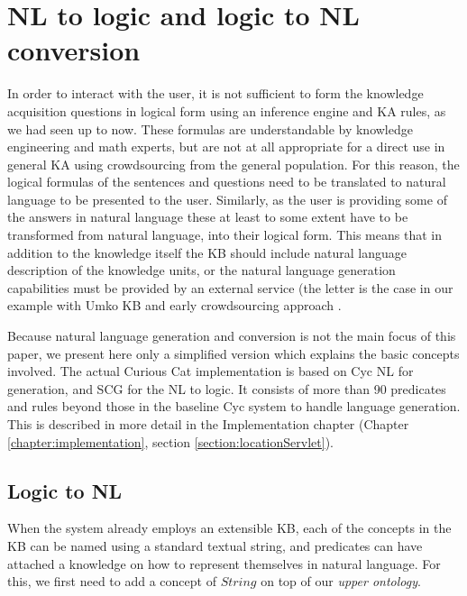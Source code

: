 \section{NL to logic and logic to NL conversion}
\label{section:nl}
In order to interact with the user, it is not sufficient to form the knowledge 
acquisition questions in logical form using an inference engine and KA rules,
as we had seen up to now. These formulas are understandable by knowledge 
engineering and math experts, but are not at all appropriate for a direct use 
in general KA using crowdsourcing from the general population. For this reason,
the logical formulas of the sentences and questions need to be translated to 
natural language to be presented to the user. Similarly, as the user is 
providing some of the answers in natural language these at least to some extent
have to be transformed from natural language, into their logical form.
This means that in addition to the knowledge itself the KB should include 
natural language description of the knowledge units, or the natural language 
generation capabilities must be provided by an external service (the letter is 
the case in our example with Umko KB \parencite{Bradesko2015} and
early crowdsourcing approach \parencite{Bradesko2012a}. 

Because natural language generation and conversion is not the main focus of 
this paper, we present here only a simplified version which explains the basic 
concepts involved. The actual Curious Cat implementation is based on 
Cyc NL\parencite{Baxter2005} for generation, and SCG\parencite{Schneider2015}
for the NL to logic. It consists of more than 90 predicates and rules beyond 
those in the baseline Cyc system to handle language generation. This is 
described in more detail in the Implementation chapter 
(Chapter \ref{chapter:implementation}, section \ref{section:locationServlet}).

\subsection{Logic to NL}
\label{section:logicNL}
When the system already employs an extensible KB, each of the concepts in the 
KB can be named using a standard textual string, and predicates can have 
attached a knowledge on how to represent themselves in natural language. For 
this, we first need to add a concept of $String$ on top of our 
\emph{upper ontology}.

